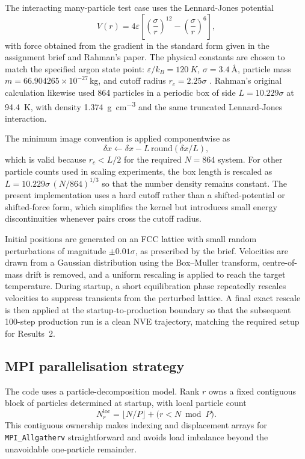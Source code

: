 \documentclass[10pt,twocolumn]{article}
\newcommand{\code}[1]{\texttt{#1}}
\begin{document}
The interacting many-particle test case uses the Lennard-Jones potential
\begin{equation}
V(r)=4\varepsilon\left[\left(\frac{\sigma}{r}\right)^{12}-\left(\frac{\sigma}{r}\right)^6\right],
\end{equation}
with force obtained from the gradient in the standard form given in the assignment brief and Rahman's paper. The physical constants are chosen to match the specified argon state point: $\varepsilon/k_B=\SI{120}{K}$, $\sigma=\SI{3.4}{\angstrom}$, particle mass $m=66.904265\times 10^{-27}\,$kg, and cutoff radius $r_c=2.25\sigma$ \citep{Rahman1964}. Rahman's original calculation likewise used 864 particles in a periodic box of side $L=10.229\sigma$ at \SI{94.4}{K}, with density \SI{1.374}{g.cm^{-3}} and the same truncated Lennard-Jones interaction.

The minimum image convention is applied componentwise as
\begin{equation}
\delta x \leftarrow \delta x - L\,\mathrm{round}(\delta x/L),
\end{equation}
which is valid because $r_c < L/2$ for the required $N=864$ system. For other particle counts used in scaling experiments, the box length is rescaled as $L=10.229\sigma\,(N/864)^{1/3}$ so that the number density remains constant. The present implementation uses a hard cutoff rather than a shifted-potential or shifted-force form, which simplifies the kernel but introduces small energy discontinuities whenever pairs cross the cutoff radius.

Initial positions are generated on an FCC lattice with small random perturbations of magnitude $\pm 0.01\sigma$, as prescribed by the brief. Velocities are drawn from a Gaussian distribution using the Box--Muller transform, centre-of-mass drift is removed, and a uniform rescaling is applied to reach the target temperature. During startup, a short equilibration phase repeatedly rescales velocities to suppress transients from the perturbed lattice. A final exact rescale is then applied at the startup-to-production boundary so that the subsequent 100-step production run is a clean NVE trajectory, matching the required setup for Results~2.

\subsection{MPI parallelisation strategy}

The code uses a particle-decomposition model. Rank $r$ owns a fixed contiguous block of particles determined at startup, with local particle count
\begin{equation}
N_r^{\mathrm{loc}} = \lfloor N/P \rfloor + \bigl(r < N \bmod P\bigr).
\end{equation}
This contiguous ownership makes indexing and displacement arrays for \code{MPI\_Allgatherv} straightforward and avoids load imbalance beyond the unavoidable one-particle remainder.
\end{document}
